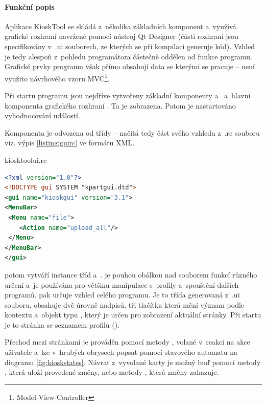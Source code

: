 \paragraph{Funkční popis}
Aplikace KioskTool se skládá z~několika základních komponent a~využívá grafické rozhraní navržené pomocí nástroj Qt Designer (části rozhraní jsou specifikovány v~.ui souborech, ze kterých se při kompilaci generuje kód). Vzhled je tedy alespoň z~pohledu programátora  částečně oddělen od funkce programu. Grafické prvky programu však přímo obsahují data se kterými se pracuje -- není využito návrhového vzoru MVC\footnote{Model-View-Controller}.

Při startu programu jsou nejdříve vytvořeny základní komponenty  a~ a~hlavní komponenta grafického rozhraní . Ta je zobrazena. Potom je nastartováno vyhodnocování událostí.

Komponenta  je odvozena od třídy  -- načítá tedy část svého vzhledu z~.rc souboru viz. výpis  \ref{listing:guirc} ve formátu XML.
\begin{mylisting}
\caption{kiosktoolui.rc}
\label{listing:guirc}
\begin{lstlisting}[language=XML]
<?xml version="1.0"?>
<!DOCTYPE gui SYSTEM "kpartgui.dtd">
<gui name="kioskgui" version="3.1">
<MenuBar>
 <Menu name="file">
    <Action name="upload_all"/>
 </Menu>
</MenuBar>
</gui>
\end{lstlisting}
\end{mylisting}

 potom vytváří instance tříd  a~.  je pouhou obálkou nad souborem funkcí různého určení a~je používána pro většinu manipulace s~profily a~spouštění dalších programů.  pak určuje vzhled celého programu. Je to třída generovaná z~.ui souboru, obsahuje dvě úrovně nadpisů, tři tlačítka která mění význam podle kontextu a~objekt typu , který je určen pro zobrazení aktuální stránky. Při startu je to stránka se seznamem profilů ().

Přechod mezi stránkami je prováděn pomocí metody , volané v~reakci na akce uživatele a~lze v~hrubých obrysech popsat pomocí stavového automatu na diagramu \ref{fig:kioskstates}. Návrat z~vyvolané karty je možný buď pomocí metody , která uloží provedené změny, nebo metody , která změny zahazuje.

